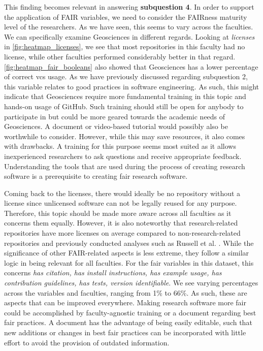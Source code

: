 This finding becomes relevant in answering \textbf{subquestion 4}. In order to support the application of FAIR variables, we need to consider the FAIRness maturity level of the researchers. As we have seen, this seems to vary across the faculties. We can specifically examine Geosciences in different regards. Looking at \textit{licenses} in \autoref{fig:heatmap_licenses}, we see that most repositories in this faculty had no license, while other faculties performed considerably better in that regard. \autoref{fig:heatmap_fair_booleans} also showed that Geosciences has a lower percentage of correct vcs usage. As we have previously discussed regarding subquestion 2, this variable relates to good practices in software engineering. As such, this might indicate that Geosciences require more fundamental training in this topic and hands-on usage of GitHub. Such training should still be open for anybody to participate in but could be more geared towards the academic needs of Geosciences. A document or video-based tutorial would possibly also be worthwhile to consider. However, while this may save resources, it also comes with drawbacks. A training for this purpose seems most suited as it allows inexperienced researchers to ask questions and receive appropriate feedback. Understanding the tools that are used during the process of creating research software is a prerequisite to creating \acrshort{fair} research software. 

Coming back to the licenses, there would ideally be no repository without a license since unlicensed software can not be legally reused for any purpose. Therefore, this topic should be made more aware across all faculties as it concerns them equally. However, it is also noteworthy that research-related repositories have more licenses on average compared to non-research-related repositories and previously conducted analyses such as Russell et al. \cite{russell_large-scale_2018}. 
While the significance of other FAIR-related aspects is less extreme, they follow a similar logic in being relevant for all faculties. For the \acrshort{fair} variables in this dataset, this concerns \textit{has citation, has install instructions, has example usage, has contribution guidelines, has tests, version identifiable}. We see varying percentages across the variables and faculties, ranging from 1\% to 66\%. As such, these are aspects that can be improved everywhere. Making research software more \acrshort{fair} could be accomplished by faculty-agnostic training or a document regarding best \acrshort{fair} practices. A document has the advantage of being easily editable, such that new additions or changes in best \acrshort{fair} practices can be incorporated with little effort to avoid the provision of outdated information. 


